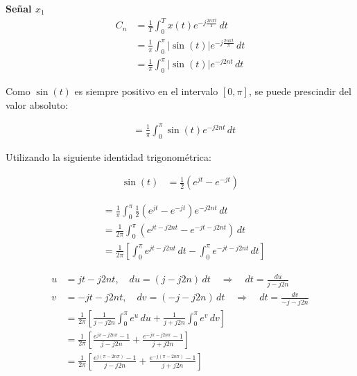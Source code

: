 \documentclass[12pt,a4paper]{report}
\begin{document}
\begin{enumerate}[label=\alph*),left=0pt]
\begin{itemize}[left=0pt]
      \textbf{Señal $x_1$}\\

      $$
      \begin{aligned}
      C_{n} &= \frac{1}{T} \int_{0}^{T} x(t) e^{-j\frac{2n\pi t}{T}} \, dt \\
      &= \frac{1}{\pi} \int_{0}^{\pi} |\sin(t)| e^{-j\frac{2n\pi t}{\pi}} \, dt \\
      &= \frac{1}{\pi} \int_{0}^{\pi} |\sin(t)| e^{-j2nt} \, dt
      \end{aligned}
      $$
      
      Como \(\sin(t)\) es siempre positivo en el intervalo \([0, \pi]\), se puede prescindir del valor absoluto:
      
      $$
      \begin{aligned}
      &= \frac{1}{\pi} \int_{0}^{\pi} \sin(t) e^{-j2nt} \, dt
      \end{aligned}
      $$
      
      Utilizando la siguiente identidad trigonométrica:
      
      $$
      \begin{aligned}
      \sin(t) &= \frac{1}{2} \left( e^{jt} - e^{-jt} \right)
      \end{aligned}
      $$
      
      $$
      \begin{aligned}
      &= \frac{1}{\pi} \int_{0}^{\pi} \frac{1}{2} \left( e^{jt} - e^{-jt} \right) e^{-j2nt} \, dt \\
      &= \frac{1}{2\pi} \int_{0}^{\pi} \left( e^{jt - j2nt} - e^{-jt - j2nt} \right) \, dt \\
      &= \frac{1}{2\pi} \left[ \int_{0}^{\pi} e^{jt - j2nt} \, dt - \int_{0}^{\pi} e^{-jt - j2nt} \, dt \right]
      \end{aligned}
      $$
      
      $$
      \begin{aligned}
      u &= jt - j2nt, \quad du = (j - j2n) \, dt \quad \Rightarrow \quad dt = \frac{du}{j - j2n} \\
      v &= -jt - j2nt, \quad dv = (-j - j2n) \, dt \quad \Rightarrow \quad dt = \frac{dv}{-j - j2n} \\
      &= \frac{1}{2\pi} \left[ \frac{1}{j - j2n} \int_{0}^{\pi} e^{u} \, du + \frac{1}{j + j2n} \int_{0}^{\pi} e^{v} \, dv \right] \\
      &= \frac{1}{2\pi} \left[ \frac{e^{j\pi - j2n\pi} - 1}{j - j2n} + \frac{e^{-j\pi - j2n\pi} - 1}{j + j2n} \right] \\
      &= \frac{1}{2\pi} \left[ \frac{e^{j(\pi - 2n\pi)} - 1}{j - j2n} + \frac{e^{-j(\pi - 2n\pi)} - 1}{j + j2n} \right]
      \end{aligned}
      $$
      

\end{itemize}
\end{enumerate}
\end{document}
